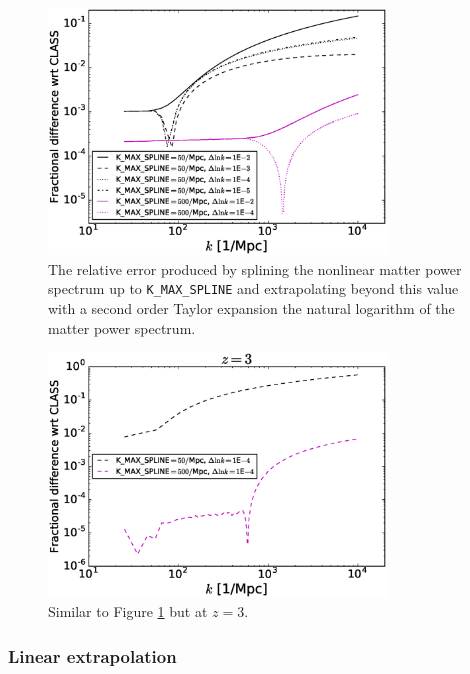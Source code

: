 \documentclass[\docopts]{\docclass}
\begin{document}
\begin{figure}
\centering
\includegraphics[width=0.8\textwidth]{note_KMAX_extrapol.eps}
\caption{The relative error produced by splining the nonlinear matter power spectrum up to {\tt K\_MAX\_SPLINE} and extrapolating beyond this value with a second order Taylor expansion the natural logarithm of the matter power spectrum.}
\label{fig:NLextrapol_z0}
\end{figure}
\begin{figure}
\centering
\includegraphics[width=0.8\textwidth]{note_KMAX_extrapol_z3.eps}
\caption{Similar to Figure \ref{fig:NLextrapol_z0} but at $z=3$.}
\label{fig:NLextrapol_z3}
\end{figure}

\subsubsection{Linear extrapolation}
\label{sec:Lextrapol}
\end{document}
